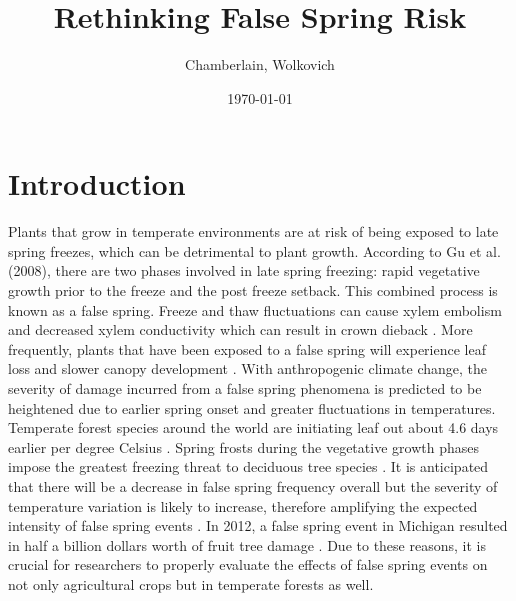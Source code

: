 \documentclass{article}\usepackage[]{graphicx}\usepackage[]{color}
\begin{document}
\title{Rethinking False Spring Risk}
\author{Chamberlain, Wolkovich}
\date{\today}
\maketitle 
\newpage
\tableofcontents
\listoffigures
\listoftables

\renewcommand{\thetable}{\arabic{table}}
\renewcommand{\thefigure}{\arabic{figure}}
\renewcommand{\labelitemi}{$-$}

\section{Introduction}
Plants that grow in temperate environments are at risk of being exposed to late spring freezes, which can be detrimental to plant growth. According to Gu et al. (2008), there are two phases involved in late spring freezing: rapid vegetative growth prior to the freeze and the post freeze setback. This combined process is known as a false spring. Freeze and thaw fluctuations can cause xylem embolism and decreased xylem conductivity which can result in crown dieback \citep{Gu2008}.
More frequently, plants that have been exposed to a false spring will experience leaf loss and slower canopy development \citep{Hufkens2012}. 
With anthropogenic climate change, the severity of damage incurred from a false spring phenomena is predicted to be heightened due to earlier spring onset and greater fluctuations in temperatures. Temperate forest species around the world are initiating leaf out about 4.6 days earlier per degree Celsius \citep{Polgar2014, Wolkovich2012}. Spring frosts during the vegetative growth phases impose the greatest freezing threat to deciduous tree species \citep{Sakai1987}. It is anticipated that there will be a decrease in false spring frequency overall but the severity of temperature variation is likely to increase, therefore amplifying the expected intensity of false spring events \citep{Allstadt2015}. In 2012, a false spring event in Michigan resulted in half a billion dollars worth of fruit tree damage \citep{Ault2013, Knudson2012}. Due to these reasons, it is crucial for researchers to properly evaluate the effects of false spring events on not only agricultural crops but in temperate forests as well.
\end{document}
